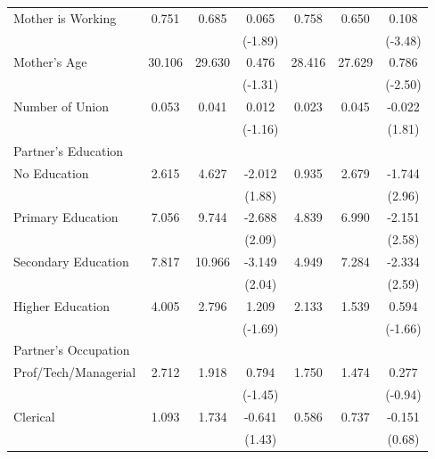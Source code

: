 \begin{longtable}{@{}l*{6}{c}@{}}
Mother is Working & 0.751 & 0.685 & 0.065\sym{*} & 0.758 & 0.650 & 0.108\sym{***} \\
                    &         &         & (-1.89) &         &         & (-3.48) \\
Mother's Age & 30.106 & 29.630 & 0.476 & 28.416 & 27.629 & 0.786\sym{**} \\
                    &         &         & (-1.31) &         &         & (-2.50) \\
Number of Union & 0.053 & 0.041 & 0.012 & 0.023 & 0.045 & -0.022\sym{*} \\
                    &         &         & (-1.16) &         &         & (1.81) \\
\multicolumn{7}{l}{Partner's Education} \\
\hspace{1em}No Education & 2.615 & 4.627 & -2.012\sym{*} & 0.935 & 2.679 & -1.744\sym{***} \\
                    &         &         & (1.88) &         &         & (2.96) \\
\hspace{1em}Primary Education & 7.056 & 9.744 & -2.688\sym{**} & 4.839 & 6.990 & -2.151\sym{**} \\
                    &         &         & (2.09) &         &         & (2.58) \\
\hspace{1em}Secondary Education & 7.817 & 10.966 & -3.149\sym{**} & 4.949 & 7.284 & -2.334\sym{***} \\
                    &         &         & (2.04) &         &         & (2.59) \\
\hspace{1em}Higher Education & 4.005 & 2.796 & 1.209\sym{*} & 2.133 & 1.539 & 0.594\sym{*} \\
                    &         &         & (-1.69) &         &         & (-1.66) \\
\multicolumn{7}{l}{Partner's Occupation} \\
\hspace{1em}Prof/Tech/Managerial & 2.712 & 1.918 & 0.794 & 1.750 & 1.474 & 0.277 \\
                    &         &         & (-1.45) &         &         & (-0.94) \\
\hspace{1em}Clerical & 1.093 & 1.734 & -0.641 & 0.586 & 0.737 & -0.151 \\
                    &         &         & (1.43) &         &         & (0.68) \\

\end{longtable}
